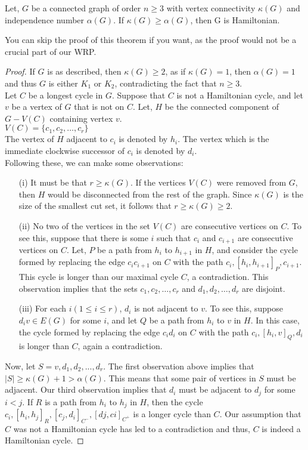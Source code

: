 \documentclass[../basic_graph_theory.tex]{subfiles}
\begin{document}
\begin{Thm}{}{}
\begin{Thm}{}{}
    Let, $G$ be a connected graph of order $n \ge 3$ with vertex connectivity $\kappa(G)$ and independence number $\alpha(G)$. If $\kappa(G) \ge \alpha(G)$, then G is Hamiltonian.
\end{Thm}
You can skip the proof of this theorem if you want, as the proof would not be a crucial part of our WRP.
\begin{proof}
    If $G$ is as described, then $\kappa(G) \ge 2$, as if $\kappa(G)=1$, then $\alpha(G)=1$ and thus $G$ is either $K_1$ or $K_2$, contradicting the fact that $n \ge 3$.\\
    Let $C$ be a longest cycle in $G$. Suppose that $C$ is not a Hamiltonian cycle, and let $v$ be a vertex of $G$ that is not on $C$. Let, $H$ be the connected component of $G-V(C)$ containing vertex $v$.\\
    $V(C)=\{c_1,c_2,\dots,c_r\}$\\
    The vertex of $H$ adjacent to $c_i$ is denoted by $h_i$. The vertex which is the immediate clockwise successor of $c_i$ is denoted by $d_i$.\\
    Following these, we can make some observations:\\
    \begin{enumerate}
        \item[(i)] It must be that $r \ge \kappa(G)$. If the vertices $V(C)$ were removed from $G$, then $H$ would be disconnected from the rest of the graph. Since $\kappa(G)$ is the size of the smallest cut set, it follows that $r \ge \kappa(G) \ge 2$.
        \item[(ii)] No two of the vertices in the set $V(C)$ are consecutive vertices on $C$. To see this, suppose that there is some $i$ such that $c_i$ and $c_{i+1}$ are consecutive vertices on $C$. Let, $P$ be a path from $h_i$ to $h_{i+1}$ in $H$, and consider the cycle formed by replacing the edge $c_ic_{i+1}$ on $C$ with the path $c_i, [h_i, h_{i+1}]_{P} , c_{i+1}$. This cycle is longer than our maximal cycle $C$, a contradiction. This observation implies that the sets ${c_1, c_2,\dots,c_r}$ and ${d_1, d_2,\dots,d_r}$ are disjoint.
        \item[(iii)] For each $i (1 \le i \le r)$, $d_i$ is not adjacent to $v$. To see this, suppose $d_{i}v \in E(G)$ for some $i$, and let $Q$ be a path from $h_i$ to $v$ in $H$. In this case, the cycle formed by replacing the edge $c_{i}d_{i}$ on $C$ with the path $c_{i}, [h_{i}, v]_{Q}, d_{i}$ is longer than $C$, again a contradiction.
    \end{enumerate}
    Now, let $S = {v,d_1, d_2,...,d_r}$. The first observation above implies that $|S| \ge \kappa(G)+1 > \alpha(G)$. This means that some pair of vertices in $S$ must be adjacent. Our third observation implies that $d_i$ must be adjacent to $d_j$ for some $i<j$. If $R$ is a path from $h_i$ to $h_j$ in $H$, then the cycle $c_i, [h_i, h_j]_{R}, [c_j , d_i]_{C^-} , [dj , ci]_{C^+}$ is a longer cycle than $C$. Our assumption that $C$ was not a Hamiltonian cycle has led to a contradiction and thus, $C$ is indeed a Hamiltonian cycle.
\end{proof}


\end{Thm}
\end{document}
